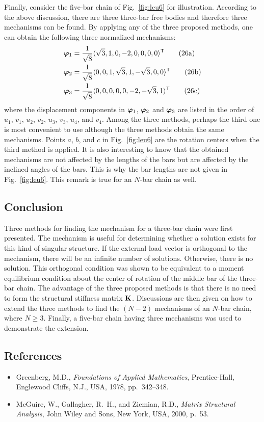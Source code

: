 Finally, consider the five-bar chain of Fig.~\ref{fig:leu6} for illustration. According to the above discussion, there are three three-bar free bodies and therefore three mechanisms can be found. By applying any of the three proposed methods, one can obtain the following three normalized mechanisms:
\begin{align}
  \bm{\varphi}_1 &= \frac{1}{\sqrt 8}\langle\sqrt3, 1, 0, -2, 0, 0, 0, 0\rangle^{\mathsf{T}} \tag{26a}\\
  \bm{\varphi}_2 &= \frac{1}{\sqrt 8}\langle 0, 0, 1, \sqrt3, 1, -\sqrt3, 0, 0\rangle^{\mathsf{T}} \tag{26b}\\
  \bm{\varphi}_3 &= \frac{1}{\sqrt 8}\langle 0, 0, 0, 0, 0, -2, -\sqrt3, 1\rangle^{\mathsf{T}} \tag{26c}
\end{align}
where the displacement components in $\bm{\varphi}_1$, $\bm{\varphi}_2$ and $\bm{\varphi}_3$ are listed in the order of $u_1$, $v_1$, $u_2$, $v_2$, $u_3$, $v_3$, $u_4$, and $v_4$. Among the three methods, perhaps the third one is most convenient to use although the three methods obtain the same mechanisms. Points $a$, $b$, and $c$ in Fig.~\ref{fig:leu6} are the rotation centers when the third method is applied. It is also interesting to know that the obtained mechanisms are not affected by the lengths of the bars but are affected by the inclined angles of the bars. This is why the bar lengths are not given in Fig.~\ref{fig:leu6}. This remark is true for an $N$-bar chain as well.

\subsection*{Conclusion}
Three methods for finding the mechanism for a three-bar chain were first presented. The mechanism is useful for determining whether a solution exists for this kind of singular structure. If the external load vector is orthogonal to the mechanism, there will be an infinite number of solutions. Otherwise, there is no solution. This orthogonal condition was shown to be equivalent to a moment equilibrium condition about the center of rotation of the middle bar of the three-bar chain. The advantage of the three proposed methods is that there is no need to form the structural stiffness matrix $\mathbf{K}$. Discussions are then given on how to extend the three methods to find the $(N-2)$ mechanisms of an $N$-bar chain, where $N\geq 3$. Finally, a five-bar chain having three mechanisms was used to demonstrate the extension.

\subsection*{References}
\begin{itemize}[leftmargin=*]
  \item Greenberg, M.D., \emph{Foundations of Applied Mathematics}, Prentice-Hall, Englewood Cliffs, N.J., USA, 1978, pp.~342--348.
  \item McGuire, W., Gallagher, R.~H., and Ziemian, R.D., \emph{Matrix Structural Analysis}, John Wiley and Sons, New York, USA, 2000, p.~53.
\end{itemize}
